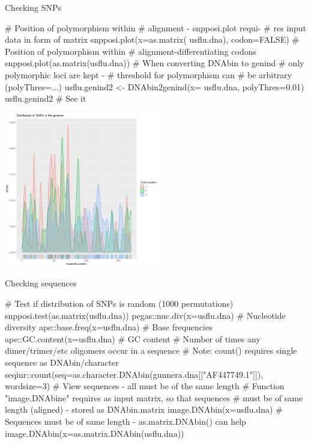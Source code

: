 \documentclass[compress, xelatex, 11pt, xcolor=svgnames, aspectratio=169,
	hyperref={
		bookmarks=true,
		unicode=true,
		colorlinks=true,
		pdftitle={Molecular data in R},
		plainpages=false,
		pdfauthor={Vojtech Zeisek},
		pdfsubject={Course about phylogeny and evolution in R},
		pdfcreator={XeLaTeX},
		pdfkeywords={R, evolution, phylogeny, molecular data},
		linkcolor=Crimson, %
		anchorcolor=Magenta, %
		citecolor=Magenta, %
		filecolor=Magenta, %
		menucolor=Magenta, %
		urlcolor=DodgerBlue, %
		},
	url={hyphens, lowtilde} %
	]{beamer}
\begin{document}
\begin{frame}[fragile]{Checking SNPs}
	\begin{multicols}{2}
		\begin{spluscode}
    # Position of polymorphism within
    # alignment - snpposi.plot requi-
    # res input data in form of matrix
    snpposi.plot(x=as.matrix(
      usflu.dna), codon=FALSE)
    # Position of polymorphism within
    # alignment-differentiating codons
    snpposi.plot(as.matrix(usflu.dna))
    # When converting DNAbin to genind
    # only polymorphic loci are kept -
    # threshold for polymorphism can
    # be arbitrary (polyThres=...)
    usflu.genind2 <- DNAbin2genind(x=
      usflu.dna, polyThres=0.01)
    usflu.genind2 # See it
		\end{spluscode}
		\begin{flushright}
			\includegraphics[height=6.75cm]{snpposi.png}
		\end{flushright}
	\end{multicols}
\end{frame}

\begin{frame}[fragile]{Checking sequences}
	\begin{spluscode}
    # Test if distribution of SNPs is random (1000 permutations)
    snpposi.test(as.matrix(usflu.dna))
    pegas::nuc.div(x=usflu.dna) # Nucleotide diversity
    ape::base.freq(x=usflu.dna) # Base frequencies
    ape::GC.content(x=usflu.dna) # GC content
    # Number of times any dimer/trimer/etc oligomers occur in a sequence
    # Note: count() requires single sequence as DNAbin/character
    seqinr::count(seq=as.character.DNAbin(gunnera.dna[["AF447749.1"]]),
      wordsize=3)
    # View sequences - all must be of the same length
    # Function "image.DNAbine" requires as input matrix, so that sequences
    # must be of same length (aligned) - stored as DNAbin.matrix
    image.DNAbin(x=usflu.dna)
    # Sequences must be of same length - as.matrix.DNAbin() can help
    image.DNAbin(x=as.matrix.DNAbin(usflu.dna))
	\end{spluscode}
\end{frame}
\end{document}
